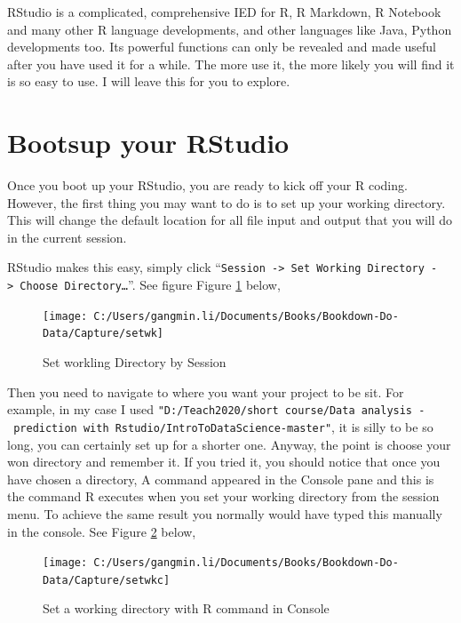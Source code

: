 \documentclass[
]{book}
\begin{document}
RStudio is a complicated, comprehensive IED for R, R Markdown, R Notebook and many other R language developments, and other languages like Java, Python developments too. Its powerful functions can only be revealed and made useful after you have used it for a while. The more use it, the more likely you will find it is so easy to use. I will leave this for you to explore.

\hypertarget{bootsup-your-rstudio}{%
\section{Bootsup your RStudio}\label{bootsup-your-rstudio}}

Once you boot up your RStudio, you are ready to kick off your R coding. However, the first thing you may want to do is to set up your working directory. This will change the default location for all file input and output that you will do in the current session.

RStudio makes this easy, simply click ``\texttt{Session\ -\textgreater{}\ Set\ Working\ Directory\ -\textgreater{}\ Choose\ Directory\ldots{}}''. See figure Figure \ref{fig:setwk} below,

\begin{figure}

{\centering \texttt{[image: C:/Users/gangmin.li/Documents/Books/Bookdown-Do-Data/Capture/setwk]} 

}

\caption{Set workling Directory by Session}\label{fig:setwk}
\end{figure}

Then you need to navigate to where you want your project to be sit. For example, in my case I used \texttt{"D:/Teach2020/short\ course/Data\ analysis\ -\ prediction\ with\ Rstudio/IntroToDataScience-master"}, it is silly to be so long, you can certainly set up for a shorter one. Anyway, the point is choose your won directory and remember it. If you tried it, you should notice that once you have chosen a directory, A command appeared in the Console pane and this is the command R executes when you set your working directory from the session menu. To achieve the same result you normally would have typed this manually in the console. See Figure \ref{fig:setwkc} below,

\begin{figure}

{\centering \texttt{[image: C:/Users/gangmin.li/Documents/Books/Bookdown-Do-Data/Capture/setwkc]} 

}

\caption{Set a working directory with R command in Console}\label{fig:setwkc}
\end{figure}
\end{document}

